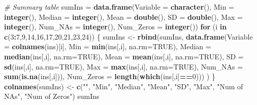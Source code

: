 \documentclass[]{article}
\newenvironment{Shaded}{\begin{snugshade}}{\end{snugshade}}
\newcommand{\KeywordTok}[1]{\textcolor[rgb]{0.13,0.29,0.53}{\textbf{#1}}}
\newcommand{\DataTypeTok}[1]{\textcolor[rgb]{0.13,0.29,0.53}{#1}}
\newcommand{\DecValTok}[1]{\textcolor[rgb]{0.00,0.00,0.81}{#1}}
\newcommand{\StringTok}[1]{\textcolor[rgb]{0.31,0.60,0.02}{#1}}
\newcommand{\CommentTok}[1]{\textcolor[rgb]{0.56,0.35,0.01}{\textit{#1}}}
\newcommand{\OtherTok}[1]{\textcolor[rgb]{0.56,0.35,0.01}{#1}}
\newcommand{\ControlFlowTok}[1]{\textcolor[rgb]{0.13,0.29,0.53}{\textbf{#1}}}
\newcommand{\OperatorTok}[1]{\textcolor[rgb]{0.81,0.36,0.00}{\textbf{#1}}}
\newcommand{\NormalTok}[1]{#1}
\begin{document}
\begin{Shaded}
\begin{Highlighting}[]
{{{{\CommentTok{# Summary table}
\NormalTok{sumIns =}\StringTok{ }\KeywordTok{data.frame}\NormalTok{(}\DataTypeTok{Variable =} \KeywordTok{character}\NormalTok{(),}
                    \DataTypeTok{Min =} \KeywordTok{integer}\NormalTok{(),}
                    \DataTypeTok{Median =} \KeywordTok{integer}\NormalTok{(),}
                    \DataTypeTok{Mean =} \KeywordTok{double}\NormalTok{(),}
                    \DataTypeTok{SD =} \KeywordTok{double}\NormalTok{(),}
                    \DataTypeTok{Max =} \KeywordTok{integer}\NormalTok{(),}
                    \DataTypeTok{Num_NAs =} \KeywordTok{integer}\NormalTok{(),}
                    \DataTypeTok{Num_Zeros =} \KeywordTok{integer}\NormalTok{())}
\ControlFlowTok{for}\NormalTok{ (i }\ControlFlowTok{in} \KeywordTok{c}\NormalTok{(}\DecValTok{3}\OperatorTok{:}\DecValTok{7}\NormalTok{,}\DecValTok{9}\NormalTok{,}\DecValTok{14}\NormalTok{,}\DecValTok{16}\NormalTok{,}\DecValTok{17}\NormalTok{,}\DecValTok{20}\NormalTok{,}\DecValTok{21}\NormalTok{,}\DecValTok{23}\NormalTok{,}\DecValTok{24}\NormalTok{)) \{}
\NormalTok{  sumIns <-}\StringTok{ }\KeywordTok{rbind}\NormalTok{(sumIns, }\KeywordTok{data.frame}\NormalTok{(}\DataTypeTok{Variable =} \KeywordTok{colnames}\NormalTok{(ins)[i],}
                                     \DataTypeTok{Min =} \KeywordTok{min}\NormalTok{(ins[,i], }\DataTypeTok{na.rm=}\OtherTok{TRUE}\NormalTok{),}
                                     \DataTypeTok{Median =} \KeywordTok{median}\NormalTok{(ins[,i], }\DataTypeTok{na.rm=}\OtherTok{TRUE}\NormalTok{),}
                                     \DataTypeTok{Mean =} \KeywordTok{mean}\NormalTok{(ins[,i], }\DataTypeTok{na.rm=}\OtherTok{TRUE}\NormalTok{),}
                                     \DataTypeTok{SD =} \KeywordTok{sd}\NormalTok{(ins[,i], }\DataTypeTok{na.rm=}\OtherTok{TRUE}\NormalTok{),}
                                     \DataTypeTok{Max =} \KeywordTok{max}\NormalTok{(ins[,i], }\DataTypeTok{na.rm=}\OtherTok{TRUE}\NormalTok{),}
                                     \DataTypeTok{Num_NAs =} \KeywordTok{sum}\NormalTok{(}\KeywordTok{is.na}\NormalTok{(ins[,i])),}
                                     \DataTypeTok{Num_Zeros =} \KeywordTok{length}\NormalTok{(}\KeywordTok{which}\NormalTok{(ins[,i]}\OperatorTok{==}\DecValTok{0}\NormalTok{)))}
\NormalTok{  )}
\NormalTok{\}}
\KeywordTok{colnames}\NormalTok{(sumIns) <-}\StringTok{ }\KeywordTok{c}\NormalTok{(}\StringTok{""}\NormalTok{, }\StringTok{"Min"}\NormalTok{, }\StringTok{"Median"}\NormalTok{, }\StringTok{"Mean"}\NormalTok{, }\StringTok{"SD"}\NormalTok{, }\StringTok{"Max"}\NormalTok{, }\StringTok{"Num of NAs"}\NormalTok{, }
                      \StringTok{"Num of Zeros"}\NormalTok{)}
\NormalTok{sumIns}

}}}}
\end{Highlighting}
\end{Shaded}
\end{document}
